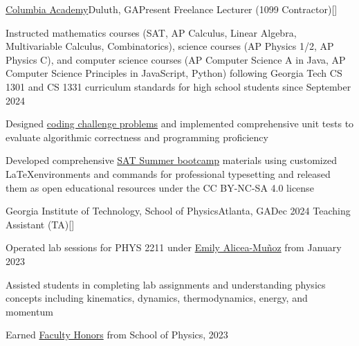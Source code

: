 \begin{resume-itemize}
  {\href{https://www.columbiaacademyga.com/}{Columbia Academy}}{Duluth, GA}{Present}
  {Freelance Lecturer (1099 Contractor)}[\href{https://github.com/JaehoonSong12/columbia_academy}{}]
  \item Instructed mathematics courses (SAT, AP Calculus, Linear Algebra, Multivariable Calculus, 
  Combinatorics), science courses (AP Physics 1/2, AP Physics C), and computer science 
  courses (AP Computer Science A in Java, AP Computer Science Principles in JavaScript, 
  Python) following Georgia Tech CS 1301 and CS 1331 curriculum standards for high 
  school students since September 2024
  \item Designed \href{https://github.com/JaehoonSong12/columbia_academy/tree/main/std03-sehwan}{coding challenge problems} and implemented comprehensive unit tests to evaluate algorithmic correctness and programming proficiency
  \item Developed comprehensive 
  \href{https://github.com/JaehoonSong12/ydjs-publish/tree/main/clba-2025_SUMMER_complete}{SAT Summer bootcamp} 
  materials using customized \LaTeX environments and commands 
  for professional typesetting and released them as open educational resources under the CC BY-NC-SA 4.0 license
\end{resume-itemize}
\begin{resume-itemize}
  {Georgia Institute of Technology, School of Physics}{Atlanta, GA}{Dec 2024}
  {Teaching Assistant (TA)}[\href{https://github.com/YundaeLeeSong/ydjs-references/tree/main/work2412-gt_physics_ta}{}]
  \item Operated lab sessions for PHYS 2211 under \href{https://physics.gatech.edu/user/emily-alicea-munoz}{Emily Alicea-Muñoz} from January 2023
  \item Assisted students in completing lab assignments and understanding physics concepts including kinematics, dynamics, thermodynamics, energy, and momentum
  \item Earned \href{https://gatech.meritpages.com/stories/Jaehoon-Song-Earns-Faculty-Honors-at-Georgia-Tech-for-the-Fall-2023-Semester/125669685}{Faculty Honors} from School of Physics, 2023
\end{resume-itemize}
